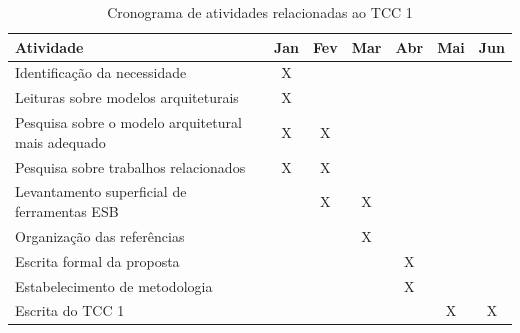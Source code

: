\begin{table}[!h]
\centering
\caption{Cronograma de atividades relacionadas ao TCC 1}
\label{cronograma_tcc1}
\begin{tabular}{|p{9cm}|c|c|c|c|c|c|}
\hline
Atividade                                                   & \multicolumn{1}{l|}{Jan} & \multicolumn{1}{l|}{Fev} & \multicolumn{1}{l|}{Mar} & \multicolumn{1}{l|}{Abr} & \multicolumn{1}{l|}{Mai} & \multicolumn{1}{l|}{Jun} \\ \hline
Identificação da necessidade                                & X                           &                             &                              &                            &                             &                              \\ \hline
Leituras sobre modelos arquiteturais                        & X                           &                             &                              &                            &                             &                              \\ \hline
Pesquisa sobre o modelo arquitetural mais adequado          & X                           & X                             &                              &                            &                             &                              \\ \hline
Pesquisa sobre trabalhos relacionados                       & X                           & X                        &                              &                            &                             &                              \\ \hline
Levantamento superficial de ferramentas ESB                 &                             & X                        & X                            &                            &                             &                              \\ \hline
Organização das referências                                 &                             &                             & X                            &                            &                             &           \\ \hline
Escrita formal da proposta                                  &                             &                             &                              & X                          &                             &           \\ \hline
Estabelecimento de metodologia                              &                             &                             &                              & X                          &                             &             \\ \hline
Escrita do TCC 1                                            &                             &                             &                              &                            & X                           & X          \\ \hline
\end{tabular}
\end{table}

